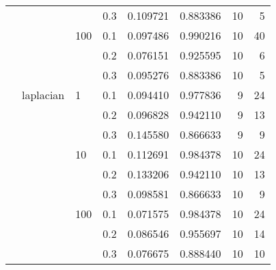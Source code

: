 \begin{table}[H]
\begin{tabular}{llllrrrr}
       &           &     & 0.3 &   0.109721 &  0.883386 &      10 &     5 \\
       &           & 100 & 0.1 &   0.097486 &  0.990216 &      10 &    40 \\
       &           &     & 0.2 &   0.076151 &  0.925595 &      10 &     6 \\
       &           &     & 0.3 &   0.095276 &  0.883386 &      10 &     5 \\
       & laplacian & 1   & 0.1 &   0.094410 &  0.977836 &       9 &    24 \\
       &           &     & 0.2 &   0.096828 &  0.942110 &       9 &    13 \\
       &           &     & 0.3 &   0.145580 &  0.866633 &       9 &     9 \\
       &           & 10  & 0.1 &   0.112691 &  0.984378 &      10 &    24 \\
       &           &     & 0.2 &   0.133206 &  0.942110 &      10 &    13 \\
       &           &     & 0.3 &   0.098581 &  0.866633 &      10 &     9 \\
       &           & 100 & 0.1 &   0.071575 &  0.984378 &      10 &    24 \\
       &           &     & 0.2 &   0.086546 &  0.955697 &      10 &    14 \\
       &           &     & 0.3 &   0.076675 &  0.888440 &      10 &    10 \\
\bottomrule
\end{tabular}
\end{table}
